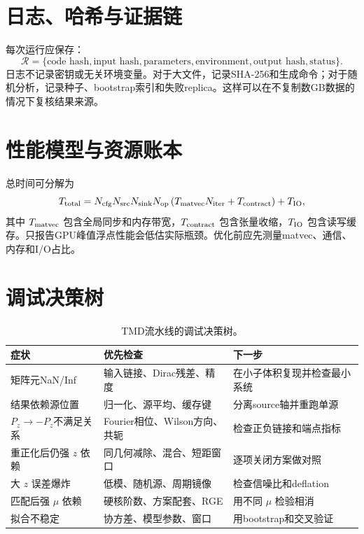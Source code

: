 \documentclass[UTF8,12pt,a4paper,twoside,openany]{ctexbook}
\begin{document}
\section{日志、哈希与证据链}

每次运行应保存：
\begin{equation}
  \mathcal R=
  \{\text{code hash},\text{input hash},\text{parameters},
  \text{environment},\text{output hash},\text{status}\}.
  \label{eq:run-record}
\end{equation}
日志不记录密钥或无关环境变量。对于大文件，记录SHA-256和生成命令；对于随机分析，记录种子、bootstrap索引和失败replica。这样可以在不复制数GB数据的情况下复核结果来源。

\section{性能模型与资源账本}

总时间可分解为
\begin{equation}
  T_{\rm total}
  =N_{\rm cfg}N_{\rm src}N_{\rm sink}N_{\rm op}
  \left(T_{\rm matvec}N_{\rm iter}+T_{\rm contract}\right)
  +T_{\rm IO},
  \label{eq:performance-model}
\end{equation}
其中 \(T_{\rm matvec}\) 包含全局同步和内存带宽，\(T_{\rm contract}\) 包含张量收缩，\(T_{\rm IO}\) 包含读写缓存。只报告GPU峰值浮点性能会低估实际瓶颈。优化前应先测量matvec、通信、内存和I/O占比。

\section{调试决策树}

\begin{table}[htbp]
\centering
\caption{TMD流水线的调试决策树。}
\label{tab:debug-tree}
\small
\begin{tabularx}{\textwidth}{L{3.0cm}L{4.2cm}Y}
\toprule
症状 & 优先检查 & 下一步 \\
\midrule
矩阵元NaN/Inf & 输入链接、Dirac残差、精度 & 在小子体积复现并检查最小系统 \\
结果依赖源位置 & 归一化、源平均、缓存键 & 分离source轴并重跑单源 \\
\(P_z\to-P_z\)不满足关系 & Fourier相位、Wilson方向、共轭 & 检查正负链接和端点指标 \\
重正化后仍强 \(z\) 依赖 & 同几何减除、混合、短距窗口 & 逐项关闭方案做对照 \\
大 \(z\) 误差爆炸 & 低模、随机源、周期镜像 & 检查信噪比和deflation \\
匹配后强 \(\mu\) 依赖 & 硬核阶数、方案配套、RGE & 用不同 \(\mu\) 检验相消 \\
拟合不稳定 & 协方差、模型参数、窗口 & 用bootstrap和交叉验证 \\
\bottomrule
\end{tabularx}
\end{table}
\end{document}
